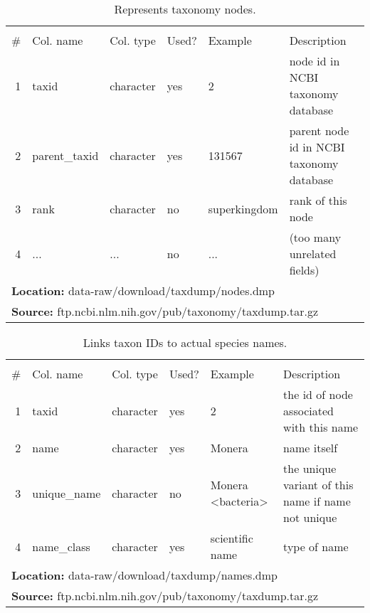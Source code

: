 \begin{table}[H]

\caption{\label{tab:ncbi_edgelist}Represents taxonomy nodes.}
\begin{tabular}[t]{rllll>{\raggedright\arraybackslash}p{18em}}
\toprule
\multicolumn{6}{c}{\bgroup\fontsize{12}{14}\selectfont \cellcolor[HTML]{EEEEEE}{\ttfamily{\textbf{ncbi\_edgelist}}}\egroup{}} \\
\cmidrule(l{3pt}r{3pt}){1-6}
\# & Col. name & Col. type & Used? & Example & Description\\
\midrule
\rowcolor{gray!6}  1 & taxid & character & yes & 2 & node id in NCBI taxonomy database\\
2 & parent\_taxid & character & yes & 131567 & parent node id in NCBI taxonomy database\\
\rowcolor{gray!6}  3 & rank & character & no & superkingdom & rank of this node\\
4 & ... & ... & no & ... & (too many unrelated fields)\\
\bottomrule
\multicolumn{6}{l}{\textbf{Location: } data-raw/download/taxdump/nodes.dmp}\\
\multicolumn{6}{l}{\textbf{Source: } ftp.ncbi.nlm.nih.gov/pub/taxonomy/taxdump.tar.gz}\\
\end{tabular}
\end{table}
\begin{table}[H]

\caption{\label{tab:ncbi_taxon_names}Links taxon IDs to actual species names.}
\begin{tabular}[t]{rllll>{\raggedright\arraybackslash}p{18em}}
\toprule
\multicolumn{6}{c}{\bgroup\fontsize{12}{14}\selectfont \cellcolor[HTML]{EEEEEE}{\ttfamily{\textbf{ncbi\_taxon\_names}}}\egroup{}} \\
\cmidrule(l{3pt}r{3pt}){1-6}
\# & Col. name & Col. type & Used? & Example & Description\\
\midrule
\rowcolor{gray!6}  1 & taxid & character & yes & 2 & the id of node associated with this name\\
2 & name & character & yes & Monera & name itself\\
\rowcolor{gray!6}  3 & unique\_name & character & no & Monera <bacteria> & the unique variant of this name if name not unique\\
4 & name\_class & character & yes & scientific name & type of name\\
\bottomrule
\multicolumn{6}{l}{\textbf{Location: } data-raw/download/taxdump/names.dmp}\\
\multicolumn{6}{l}{\textbf{Source: } ftp.ncbi.nlm.nih.gov/pub/taxonomy/taxdump.tar.gz}\\
\end{tabular}
\end{table}

